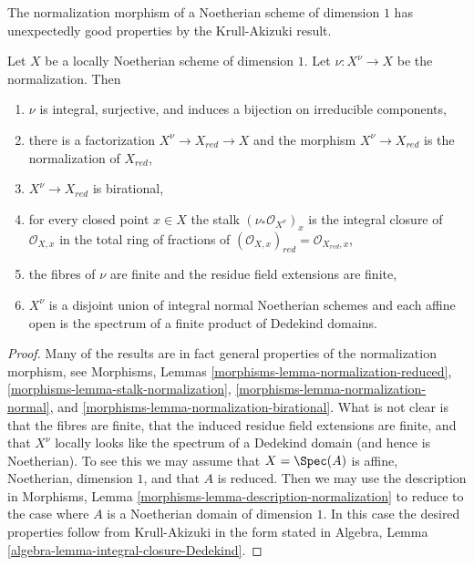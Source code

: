 \noindent
The normalization morphism of a Noetherian scheme of dimension
$1$ has unexpectedly good properties by the Krull-Akizuki result.

\begin{lemma}
\label{lemma-normalize-noetherian-dim-1}
Let $X$ be a locally Noetherian scheme of dimension $1$.
Let $\nu : X^\nu \to X$ be the normalization. Then
\begin{enumerate}
\item $\nu$ is integral, surjective, and induces a bijection
on irreducible components,
\item there is a factorization $X^\nu \to X_{red} \to X$
and the morphism $X^\nu \to X_{red}$ is the normalization
of $X_{red}$,
\item $X^\nu \to X_{red}$ is birational,
\item for every closed point $x \in X$ the stalk
$(\nu_*\mathcal{O}_{X^\nu})_x$ is the integral closure
of $\mathcal{O}_{X, x}$ in the total ring of fractions
of $(\mathcal{O}_{X, x})_{red} = \mathcal{O}_{X_{red}, x}$,
\item the fibres of $\nu$ are finite and the residue
field extensions are finite,
\item $X^\nu$ is a disjoint union of integral normal Noetherian
schemes and each affine open is the spectrum of a finite
product of Dedekind domains.
\end{enumerate}
\end{lemma}

\begin{proof}
Many of the results are in fact general properties of the normalization
morphism, see
Morphisms, Lemmas \ref{morphisms-lemma-normalization-reduced},
\ref{morphisms-lemma-stalk-normalization},
\ref{morphisms-lemma-normalization-normal}, and
\ref{morphisms-lemma-normalization-birational}.
What is not clear is that the fibres are finite,
that the induced residue field extensions are finite, and
that $X^\nu$ locally looks like the spectrum of a
Dedekind domain (and hence is Noetherian).
To see this we may assume that $X = \Spec(A)$ is
affine, Noetherian, dimension $1$, and that $A$ is reduced.
Then we may use the description in
Morphisms, Lemma \ref{morphisms-lemma-description-normalization}
to reduce to the case where $A$ is a Noetherian domain
of dimension $1$. In this case the desired properties
follow from Krull-Akizuki in the form stated in
Algebra, Lemma \ref{algebra-lemma-integral-closure-Dedekind}.
\end{proof}

